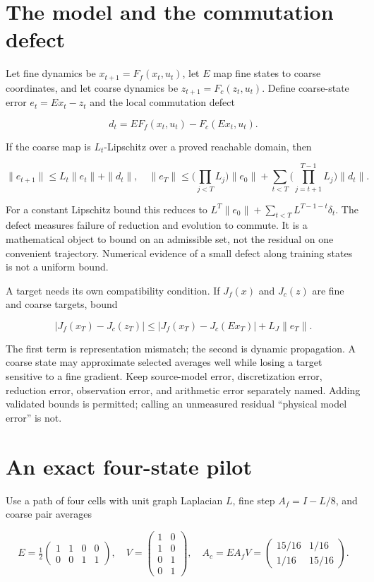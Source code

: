 \documentclass[
  11pt,
  a4paper,
]{report}
\begin{document}
\hypertarget{the-model-and-the-commutation-defect}{%
\section{The model and the commutation
defect}\label{the-model-and-the-commutation-defect}}

Let fine dynamics be \(x_{t+1}=F_f(x_t,u_t)\), let \(E\) map fine states
to coarse coordinates, and let coarse dynamics be
\(z_{t+1}=F_c(z_t,u_t)\). Define coarse-state error \(e_t=Ex_t-z_t\) and
the local commutation defect

\[
 d_t=EF_f(x_t,u_t)-F_c(Ex_t,u_t).
\]

If the coarse map is \(L_t\)-Lipschitz over a proved reachable domain,
then

\[
 \|e_{t+1}\|\le L_t\|e_t\|+\|d_t\|,
\quad
 \|e_T\|\le\Big(\prod_{j<T}L_j\Big)\|e_0\|
 +\sum_{t<T}\Big(\prod_{j=t+1}^{T-1}L_j\Big)\|d_t\|.
\]

For a constant Lipschitz bound this reduces to
\(L^T\|e_0\|+\sum_{t<T}L^{T-1-t}\delta_t\). The defect measures failure
of reduction and evolution to commute. It is a mathematical object to
bound on an admissible set, not the residual on one convenient
trajectory. Numerical evidence of a small defect along training states
is not a uniform bound.

A target needs its own compatibility condition. If \(J_f(x)\) and
\(J_c(z)\) are fine and coarse targets, bound

\[
 |J_f(x_T)-J_c(z_T)|\le
 |J_f(x_T)-J_c(Ex_T)|+L_J\|e_T\|.
\]

The first term is representation mismatch; the second is dynamic
propagation. A coarse state may approximate selected averages well while
losing a target sensitive to a fine gradient. Keep source-model error,
discretization error, reduction error, observation error, and arithmetic
error separately named. Adding validated bounds is permitted; calling an
unmeasured residual ``physical model error'' is not.

\hypertarget{an-exact-four-state-pilot}{%
\section{An exact four-state pilot}\label{an-exact-four-state-pilot}}

Use a path of four cells with unit graph Laplacian \(L\), fine step
\(A_f=I-L/8\), and coarse pair averages

\[
 E=\tfrac12\begin{pmatrix}1&1&0&0\\0&0&1&1\end{pmatrix},
 \quad V=\begin{pmatrix}1&0\\1&0\\0&1\\0&1\end{pmatrix},
 \quad A_c=EA_fV=\begin{pmatrix}15/16&1/16\\1/16&15/16\end{pmatrix}.
\]
\end{document}
